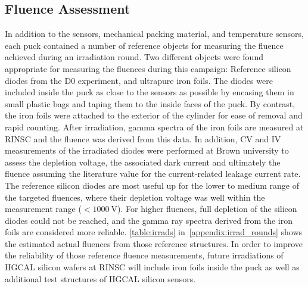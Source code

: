 \subsection{Fluence Assessment}
In addition to the sensors, mechanical packing material, and temperature sensors, each puck contained a number of reference objects for measuring the fluence achieved during an irradiation round. 
Two different objects were found appropriate for measuring the fluences during this campaign: Reference silicon diodes from the D0 experiment, and ultrapure iron foils. 
The diodes were included inside the puck as close to the sensors as possible by encasing them in small plastic bags and taping them to the inside faces of the puck. 
By contrast, the iron foils were attached to the exterior of the cylinder for ease of removal and rapid counting. \newline
After irradiation, gamma spectra of the iron foils are measured at RINSC and the fluence was derived from this data.
In addition, CV and IV measurements of the irradiated diodes were performed at Brown university to assess the depletion voltage, the associated dark current and ultimately the fluence assuming the literature value for the current-related leakage current rate.\newline
The reference silicon diodes are most useful up for the lower to medium range of the targeted fluences,  where their depletion voltage was well within the measurement range ($<\SI{1000}{\volt}$).
For higher fluences, full depletion of the silicon diodes could not be reached, and the gamma ray spectra derived from the iron foils are considered more reliable.
\ref{table:irrads} in~\ref{appendix:irrad_rounds} shows the estimated actual fluences from those reference structures.\newline
In order to improve the reliability of those reference fluence measurements, future irradiations of HGCAL silicon wafers at RINSC will include iron foils inside the puck as well as additional test structures of HGCAL silicon sensors.